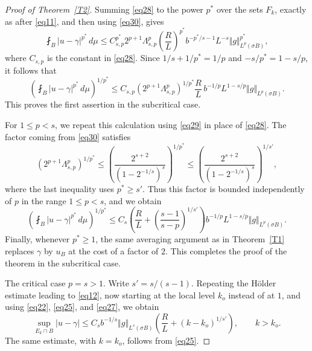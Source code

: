 \documentclass[10pt,a4paper]{amsart}
\begin{document}
\begin{proof}[Proof of Theorem~\ref{T2}]
Summing \eqref{eq28} to the power $p^*$ over the sets $F_k$, exactly as
after \eqref{eq11}, and then using \eqref{eq30}, gives
\[
 \fint_B |u-\gamma|^{p^*}\,d\mu
 \leq C_{s,p}^{p^*}2^{p+1}\Lambda_{s,p}^p\left(\frac RL\right)^{p^*}
 b^{-p^*/s-1}L^{-s}\Vert g\Vert_{L^p(\sigma B)}^{p^*},
\]
where $C_{s,p}$ is the constant in \eqref{eq28}.
Since $1/s+1/p^*=1/p$ and $-s/p^*=1-s/p$, it follows that
\[
 \left(\fint_B|u-\gamma|^{p^*}\,d\mu\right)^{1/p^*}
 \leq C_{s,p}\left(2^{p+1}\Lambda_{s,p}^p\right)^{1/p^*}\frac RL\,b^{-1/p}L^{1-s/p}
 \Vert g\Vert_{L^p(\sigma B)}.
\]
This proves the first assertion in the subcritical case.

For $1\leq p<s$, we repeat this calculation using
\eqref{eq29} in place of \eqref{eq28}.
The factor coming from \eqref{eq30} satisfies
\[
 \left(2^{p+1}\Lambda_{s,p}^p\right)^{1/p^*}
 \leq
 \left(\frac{2^{s+2}}{(1-2^{-1/s})^s}\right)^{1/p^*}
 \leq
 \left(\frac{2^{s+2}}{(1-2^{-1/s})^s}\right)^{1/s'},
\]
where the last inequality uses $p^*\geq s'$.
Thus this factor is bounded independently of $p$ in the
range $1\leq p<s$, and we obtain
\[
 \left(\fint_B|u-\gamma|^{p^*}\,d\mu\right)^{1/p^*}
 \leq C_s\left(
 \frac RL+\left(\frac{s-1}{s-p}\right)^{1/s'}
 \right)b^{-1/p}L^{1-s/p}
 \Vert g\Vert_{L^p(\sigma B)}.
\]
Finally, whenever $p^*\geq1$, the same averaging argument
as in Theorem~\ref{T1} replaces $\gamma$ by $u_B$ at the
cost of a factor of $2$. This completes the proof of the theorem
in the subcritical case.


\medskip
\noindent
{\sc The critical case $p=s>1$.}
Write $s'=s/(s-1)$. Repeating the H\"older estimate leading to
\eqref{eq12}, now starting at the local level $k_o$ instead of
at $1$, and using \eqref{eq22}, \eqref{eq25}, and \eqref{eq27},
we obtain
\begin{equation}
\label{eq31}
 \sup_{E_k\cap B}|u-\gamma|
 \leq C_sb^{-1/s}\Vert g\Vert_{L^s(\sigma B)}
 \left(\frac RL+(k-k_o)^{1/s'}\right),
 \qquad k>k_o.
\end{equation}
The same estimate, with $k=k_o$, follows from \eqref{eq25}.


\end{proof}
\end{document}
